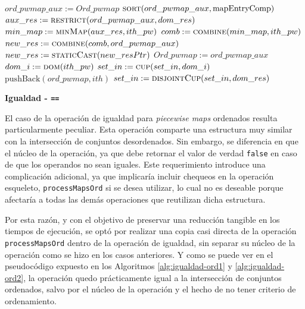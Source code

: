 \begin{algorithm}
\begin{algorithmic}[1]
            \State $ord\_pwmap\_aux := Ord\_pwmap$
            \State $\Call{sort}{ord\_pwmap\_aux, \mathrm{mapEntryComp}}$
            \State $aux\_res := \Call{restrict}{ord\_pwmap\_aux, dom\_res}$
            \State $min\_map := \Call{minMap}{aux\_res, ith\_pw}$
            \State $comb := \Call{combine}{min\_map, ith\_pw}$
            \State $new\_res := \Call{combine}{comb, ord\_pwmap\_aux}$
            \State $new\_res := \Call{staticCast}{new\_resPtr}$
            \State $Ord\_pwmap := ord\_pwmap\_aux$
            \State $dom\_i := \Call{dom}{ith\_pw}$
            \State $set\_in := \Call{cup}{set\_in, dom\_i}$
        \Else
            \State $\mathrm{pushBack}(ord\_pwmap, ith)$
            \State $set\_in := \Call{disjointCup}{set\_in, dom\_res}$
        \EndIf
    \EndIf
\EndFunction
\end{algorithmic}
\end{algorithm}



{\bf Igualdad - \texttt{==}}

El caso de la operación de igualdad para \textit{piecewise maps} ordenados resulta particularmente peculiar. Esta operación comparte una estructura muy similar con la intersección de conjuntos desordenados. Sin embargo, se diferencia en que el núcleo de la operación, ya que debe retornar el valor de verdad \texttt{false} en caso de que los operandos no sean iguales. Este requerimiento introduce una complicación adicional, ya que implicaría incluir chequeos en la operación esqueleto, \texttt{processMapsOrd} si se desea utilizar, lo cual no es deseable porque afectaría a todas las demás operaciones que reutilizan dicha estructura.

Por esta razón, y con el objetivo de preservar una reducción tangible en los tiempos de ejecución, se optó por realizar una copia casi directa de la operación \texttt{processMapsOrd} dentro de la operación de igualdad, sin separar su núcleo de la operación como se hizo en los casos anteriores. Y como se puede ver en el pseudocódigo expuesto en los Algoritmos \ref{alg:igualdad-ord1} y \ref{alg:igualdad-ord2}, la operación quedo prácticamente igual a la intersección de conjuntos ordenados, salvo por el núcleo de la operación y el hecho de no tener criterio de ordenamiento.

